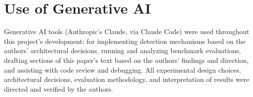 \documentclass[sigconf,anonymous,review]{acmart}
\begin{document}
\section*{Use of Generative AI}
Generative AI tools (Anthropic's Claude, via Claude Code) were used
throughout this project's development: for implementing detection
mechanisms based on the authors' architectural decisions, running and
analyzing benchmark evaluations, drafting sections of this paper's text
based on the authors' findings and direction, and assisting with code
review and debugging. All experimental design choices, architectural
decisions, evaluation methodology, and interpretation of results were
directed and verified by the authors.



\end{document}
